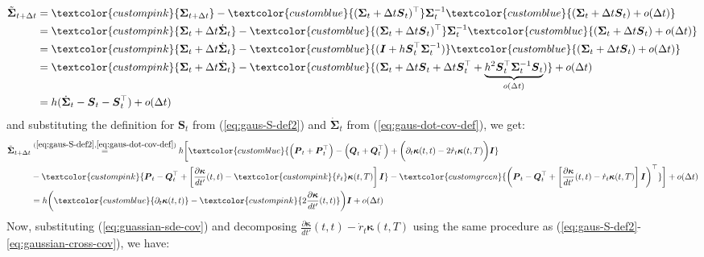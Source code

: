 \documentclass{article}
\newcommand{\bluetext}[1]{\textcolor{customblue}{#1}}
\newcommand{\greentext}[1]{\textcolor{customgreen}{#1}}
\newcommand{\pinktext}[1]{\textcolor{custompink}{#1}}
\begin{document}
\begin{align}
    \tilde{\boldsymbol{\Sigma}}_{t+\Delta t}&=\pinktext{\boldsymbol{\Sigma}_{t+\Delta t}}-\bluetext{(\boldsymbol{\Sigma}_t+\Delta t\boldsymbol{S}_t)^\top}\boldsymbol{\Sigma}_t^{-1}\bluetext{(\boldsymbol{\Sigma}_t+\Delta t\boldsymbol{S}_t) + o(\Delta t)}\nonumber\\
    &=\pinktext{\boldsymbol{\Sigma}_t+\Delta t\dot{\boldsymbol{\Sigma}}_t}-\bluetext{(\boldsymbol{\Sigma}_t+\Delta t\boldsymbol{S}_t)^\top}\boldsymbol{\Sigma}_t^{-1}\bluetext{(\boldsymbol{\Sigma}_t+\Delta t\boldsymbol{S}_t) + o(\Delta t)}\nonumber\\
    &=\pinktext{\boldsymbol{\Sigma}_t+\Delta t\dot{\boldsymbol{\Sigma}}_t}-\bluetext{(\boldsymbol{I}+h\boldsymbol{S}_t^\top\boldsymbol{\Sigma}_t^{-1})}\bluetext{(\boldsymbol{\Sigma}_t+\Delta t\boldsymbol{S}_t) + o(\Delta t)}\nonumber\\
    &=\pinktext{\boldsymbol{\Sigma}_t+\Delta t\dot{\boldsymbol{\Sigma}}_t}-\bluetext{(\boldsymbol{\Sigma}_t+\Delta t\boldsymbol{S}_t+\Delta t\boldsymbol{S}_t^\top+\underbrace{h^2\boldsymbol{S}_t^\top\boldsymbol{\Sigma}_t^{-1}\boldsymbol{S}_t}_{o(\Delta t)})} + o(\Delta t)\nonumber\\
    &=h(\dot{\boldsymbol{\Sigma}}_t-\boldsymbol{S}_t-\boldsymbol{S}_t^\top) + o(\Delta t)
\end{align}
and substituting the definition for $\boldsymbol{S}_t$ from (\ref{eq:gaus-S-def2}) and $\dot{\boldsymbol{\Sigma}}_t$ from (\ref{eq:gaus-dot-cov-def}), we get:
\begin{align}
    \tilde{\boldsymbol{\Sigma}}_{t+\Delta t}&\overset{(\ref{eq:gaus-S-def2}, \ref{eq:gaus-dot-cov-def})}{=}h\bigg[\bluetext{\left(\boldsymbol{P}_t+\boldsymbol{P}^\top_t\right)-\left(\boldsymbol{Q}_t+\boldsymbol{Q}^\top_t\right)+\bigg(\partial_t\boldsymbol{\kappa}(t,t)-2\dot{r}_t\boldsymbol{\kappa}(t,T)\bigg)\boldsymbol{I}}\nonumber\\
    &-\pinktext{\boldsymbol{P}_t-\boldsymbol{Q}_t^\top+\left[\frac{\partial\boldsymbol{\kappa}}{dt'}(t,t)-\pinktext{\dot{r}_t}\boldsymbol{\kappa}(t,T)\right]\boldsymbol{I}}-\greentext{\bigg(\boldsymbol{P}_t-\boldsymbol{Q}_t^\top+\left[\frac{\partial\boldsymbol{\kappa}}{dt'}(t,t)-\dot{r}_t\boldsymbol{\kappa}(t,T)\right]\boldsymbol{I}\bigg)^\top}\bigg] + o(\Delta t)\nonumber\\
    &=h\bigg(\bluetext{\partial_t\boldsymbol{\kappa}(t,t)}-\pinktext{2\frac{\partial\boldsymbol{\kappa}}{dt'}(t,t)}\bigg)\boldsymbol{I}+o(\Delta t)
\end{align}
Now, substituting (\ref{eq:guassian-sde-cov}) and decomposing $\frac{\partial\boldsymbol{\kappa}}{dt'}(t,t)-\dot{r}_t\boldsymbol{\kappa}(t,T)$ using the same procedure as (\ref{eq:gaus-S-def2}-\ref{eq:gaussian-cross-cov}), we have:
\end{document}
